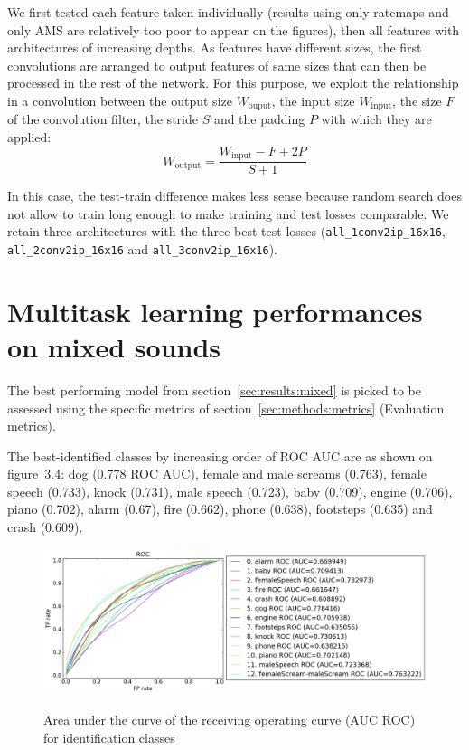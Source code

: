 We first tested each feature taken individually (results using only ratemaps and only AMS are relatively too poor to appear on the figures), then all features with architectures of increasing depths. As features have different sizes, the first convolutions are arranged to output features of same sizes that can then be processed in the rest of the network. For this purpose, we exploit the relationship in a convolution between the output size $W_{\text{ouput}}$, the input size $W_{\text{input}}$, the size $F$ of the convolution filter, the stride $S$ and the padding $P$ with which they are applied:
\begin{equation}
W_{\text{output}} = \frac{W_{\text{input}} - F + 2P}{S + 1}
\end{equation}

In this case, the test-train difference makes less sense because random search does not allow to train long enough to make training and test losses comparable. We retain three architectures with the three best test losses (\verb+all_1conv2ip_16x16+, \verb+all_2conv2ip_16x16+ and \verb+all_3conv2ip_16x16+).


\section{Multitask learning performances on mixed sounds}
\label{sec:results:perf}

The best performing model from section~\ref{sec:results:mixed} is picked to be assessed using the specific metrics of section~\ref{sec:methods:metrics} (Evaluation metrics).

The best-identified classes by increasing order of ROC AUC are as shown on figure~3.4:
dog (0.778 ROC AUC),
female and male screams (0.763),
female speech (0.733),
knock (0.731),
male speech (0.723),
baby (0.709),
engine (0.706),
piano (0.702),
alarm (0.67),
fire (0.662),
phone (0.638),
footsteps (0.635) and
crash (0.609).

\begin{figure}
\hspace*{-2cm}
\centering
\includegraphics[scale=0.45]{images-architecture-mixed/id_roc}
\label{fig:results:id_roc}
\caption{Area under the curve of the receiving operating curve (AUC ROC) for identification classes}
\end{figure}

